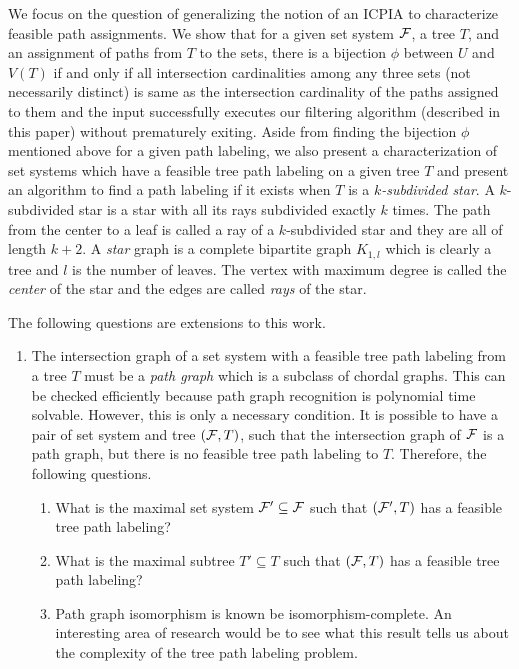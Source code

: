 \documentclass[twoside,12pt]{article}                        %
\begin{document}
{\noindent
We focus on the question of generalizing the notion of an ICPIA
\cite{nsnrs09} to characterize feasible path assignments.  We show
that for a given set system ${\cal F}$, a tree $T$, and an assignment of
paths from $T$ to the sets, there is a bijection $\phi$ between $U$
and $V(T)$ if and only if all intersection cardinalities among any
three sets (not necessarily distinct) is same as the intersection
cardinality of the paths assigned to them and the input successfully
executes our filtering algorithm (described in this paper) without
prematurely exiting.  Aside from finding the bijection $\phi$
mentioned above for a given path labeling, we also present a
characterization of set systems which have a feasible tree path
labeling on a given tree $T$ and present an algorithm to find a path
labeling if it exists when $T$ is a {\em $k$-subdivided star}. A 
  $k$-subdivided star is a star with all its rays subdivided exactly
$k$ times. The path from the center to a leaf is called a ray of a
$k$-subdivided star and they are all of length $k+2$. A {\em star}
graph is a complete bipartite graph $K_{1,l}$ which is clearly a tree
and $l$ is the number of leaves. The vertex with maximum degree is
called the {\em center} of the star and the edges are called {\em
  rays} of the star.

\noindent
The following questions are extensions to this work.
\begin{enumerate}
\item 
  The intersection graph of a set system with a feasible tree path
  labeling from a tree $T$ must be a {\em path graph} which is a
  subclass of chordal graphs. This can be checked efficiently because
  path graph recognition is polynomial time solvable\cite{gav78,
    aas93}. However, this is only a necessary condition.  It is
  possible to have a pair of set system and tree $({\cal F}, T)$, such that
  the intersection graph of ${\cal F}$ is a path graph, but there is no
  feasible tree path labeling to $T$. Therefore, the
  following questions.
  \begin{enumerate}
  \item What is the maximal set system ${\cal F}' \subseteq {\cal F}$ such that
    $({\cal F}', T)$ has a feasible tree path labeling?
  \item What is the maximal subtree $T' \subseteq T$ such that $({\cal F},
    T)$ has a feasible tree path labeling?
  \item Path graph isomorphism is known be
    isomorphism-complete\cite{kklv10}. An interesting area of research
    would be to see what this result tells us about the complexity of
    the tree path labeling problem.
  \end{enumerate}


\end{enumerate}}
\end{document}
